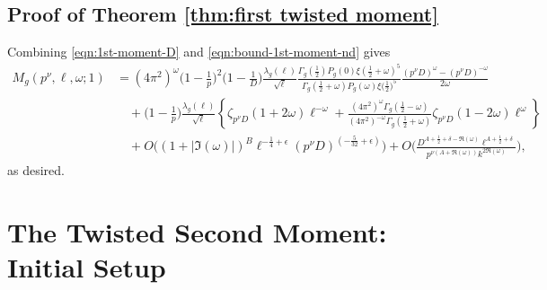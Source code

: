 \documentclass[12pt]{amsart}
\theoremstyle{plain}
\theoremstyle{definition}
\begin{document}

\subsection{Proof of Theorem \ref{thm:first twisted moment}} Combining  \eqref{eqn:1st-moment-D} and \eqref{eqn:bound-1st-moment-nd}  gives
\begin{align*}
M_g(p^{\nu},\ell,\omega;1)
&=  \left(4\pi^2\right)^\omega \Big(1-\frac{1}{p}\Big)^2   \Big(1-\frac{1}{D}\Big) \frac{ \lambda_g(\ell)}{\sqrt\ell} 
       \frac{\Gamma_g\left(\frac12\right)P_g(0)\xi\left(\frac12+\omega\right)^5}{\Gamma_g\left(\frac12+\omega\right)P_g(\omega)\xi\big(\frac12\big)^5}
        \frac{(p^\nu D)^\omega-(p^\nu D)^{-\omega}}{2\omega} 
        \\&\quad+ \Big(1-\frac{1}{p}\Big) \frac{ \lambda_g(\ell)}{\sqrt\ell} \left\{ 
     \zeta_{p^\nu D} (1+2\omega)\ell^{-\omega}
  +  \frac{(4\pi^2)^{\omega} \Gamma_g(\frac12-\omega)}{(4\pi^2)^{-\omega} \Gamma_g(\frac12+\omega)}     \zeta_{p^\nu D} (1-2\omega)
   \ell^{\omega}\right\}
   \\&\quad
   +O\Big((1+|\Im(\omega)|)^B \ell^{-\frac14+\epsilon} (p^\nu D)^{\left(-\frac{5}{32}+\epsilon\right)}\Big)
   +O\bigg( \frac{D^{A+\frac12+\delta-\Re(\omega)} \ell^{A+\frac12+\delta}  }{p^{\nu(A+\Re(\omega))} k^{2\Re(\omega)}}\bigg),
\end{align*}
as desired.



\section{The Twisted Second Moment: Initial Setup}\label{sec:second moment}
\end{document}
